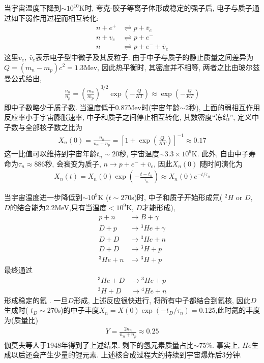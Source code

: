 当宇宙温度下降到$\sim 10^{10}$K时, 夸克-胶子等离子体形成稳定的强子后, 电子与质子通过如下弱作用过程而相互转化:
\begin{align*}
    n+e^+&\rightleftharpoons p+\bar{v}_e\\
    n+v_e&\rightleftharpoons p+e^-\\
    n&\rightleftharpoons p+e^-+\bar{v}_e
\end{align*}
这里$v_e,\ \bar{v}_e$表示电子型中微子及其反粒子. 由于中子与质子的静止质量之间差异为$Q=(m_n-m_p)c^2=1.3$Mev, 因此热平衡时, 其密度并不相等, 两者之比由玻尔兹曼公式给出, 
\begin{align*}
    \frac{n_n}{n_p}=\left( \frac{m_n}{m_p} \right)^{3/2}\exp\left( -\frac{Q}{KT} \right) \approx \exp\left( -\frac{Q}{KT} \right)
\end{align*}
即中子数略少于质子数. 当温度低于0.87Mev时(宇宙年龄$\sim$2秒), 上面的弱相互作用反应率小于宇宙膨胀速率, 中子和质子之间停止相互转化, 其数密度``冻结'', 定义中子数与全部核子数之比为
\begin{align*}
    X_n(0)=\frac{n_n}{n_n+n_p}=\left[ 1+\exp\left( \frac{Q}{KT} \right) \right]^{-1}\approx 0.17
\end{align*}
这一比值可以维持到宇宙年龄$t_n\sim 20$秒, 宇宙温度$\sim 3.3\times 10^9$K. 此外, 自由中子寿命为$\tau_n \approx 886$秒, 会衰变为质子, $n\rightarrow p+e^-+\bar{v}_e$, 因此$X_n(0)$ 随时间演化为
\begin{align*}
    X_n(t)=X_n(0)\exp\left( -\frac{t-t_n}{\tau_n} \right)\approx X_n(0)e^{-t/\tau_n}
\end{align*}

当宇宙温度进一步降低到$\sim 10^9$K ($t\sim 270$s)时, 中子和质子开始形成氘( ${}^2H$ or $D$, $D$的结合能为2.2MeV,只有当温度$<10^9$K, $D$才能形成), 
\begin{align*}
    p+n&\rightarrow B+\gamma\\
    D+p&\rightarrow {}^3He+\gamma\\
    D+D&\rightarrow {}^3He+n\\
    D+D&\rightarrow {}^3H+p\\
    {}^3He+n&\rightarrow {}^3H+p
\end{align*}
最终通过
\begin{align*}
    {}^3He+D&\rightarrow {}^3He+p\\
    {}^3H+D&\rightarrow {}^4He+n
\end{align*}
形成稳定的氦 . 一旦$D$形成, 上述反应很快进行, 将所有中子都结合到氦核, 因此$D$生成时( $t_D\sim 270$s)的中子丰度$X_n=X(0)\exp(-t_D/ \tau_n )=0.125$,此时氦的丰度为(质量比)
\begin{align*}
    Y=\frac{2n_n}{n_n+n_p}\approx 0.25
\end{align*}
伽莫夫等人于1948年得到了上述结果. 剩下的氢元素质量占比$\sim 75\%$. 事实上, $He$生成以后还会产生少量的锂元素. 上述核合成过程大约持续到宇宙爆炸后3分钟. 

